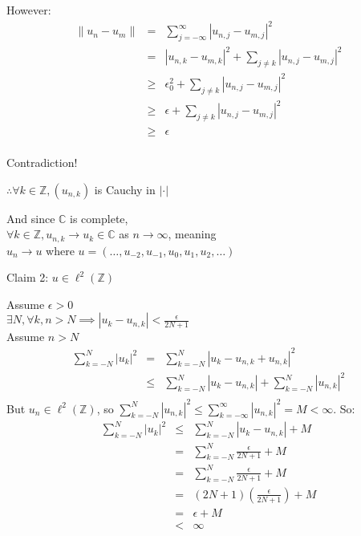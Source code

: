 \documentclass[letterpaper,12pt,fleqn]{article}
\newcommand{\abs}[1]{\left|#1\right|}
\newcommand{\norm}[1]{\lVert#1\rVert}
\newcommand{\C}{\mathbb{C}}
\newcommand{\Z}{\mathbb{Z}}
\newcommand{\ltwoz}{\ell^2(\Z)}
\begin{document}
\begin{description}
\begin{description}
\begin{theproof}
However:
\begin{eqnarray*}
\norm{u_n-u_m} &=& \sum_{j=-\infty}^{\infty}\abs{u_{n,j}-u_{m,j}}^2 \\
    &=& \abs{u_{n,k}-u_{m,k}}^2+\sum_{j\ne k}\abs{u_{n,j}-u_{m,j}}^2 \\
    &\ge& \epsilon_0^2+\sum_{j\ne k}\abs{u_{n,j}-u_{m,j}}^2 \\
    &\ge& \epsilon+\sum_{j\ne k}\abs{u_{n,j}-u_{m,j}}^2 \\
    &\ge& \epsilon \\
\end{eqnarray*}

Contradiction!

$\therefore\forall k\in\Z, (u_{n,k})$ is Cauchy in $\abs{\cdot}$
\end{theproof}
And since $\C$ is complete, \\
$\forall k\in\Z,u_{n,k}\to u_k\in\C$ as $n\to\infty$, meaning \\
$u_n\to u$ where $u=(\ldots, u_{-2}, u_{-1}, u_0, u_1, u_2, \ldots)$ \\

\item{Claim 2: $u\in\ltwoz$}
\begin{theproof}
Assume $\epsilon>0$ \\
$\exists N,\forall k,n>N\implies\abs{u_k-u_{n,k}}<\frac{\epsilon}{2N+1}$ \\
Assume $n>N$ \\
\begin{eqnarray*}
\sum_{k=-N}^{N}\abs{u_k}^2 &=& \sum_{k=-N}^{N}\abs{u_k-u_{n,k}+u_{n,k}}^2 \\
    &\le& \sum_{k=-N}^{N}\abs{u_k-u_{n,k}}+\sum_{k=-N}^{N}\abs{u_{n,k}}^2 \\
\end{eqnarray*}
But $u_n\in\ltwoz$, so $\sum_{k=-N}^{N}\abs{u_{n,k}}^2\le
    \sum_{k=-\infty}^{\infty}\abs{u_{n,k}}^2=M<\infty$. So:
\begin{eqnarray*}
\sum_{k=-N}^{N}\abs{u_k}^2 &\le& \sum_{k=-N}^{N}\abs{u_k-u_{n,k}}+M \\
    &=& \sum_{k=-N}^{N}\frac{\epsilon}{2N+1}+M \\
    &=& \sum_{k=-N}^{N}\frac{\epsilon}{2N+1}+M \\
    &=& (2N+1)\left(\frac{\epsilon}{2N+1}\right)+M \\
    &=& \epsilon+M \\
    &<& \infty \\
\end{eqnarray*}


\end{theproof}
\end{description}
\end{description}
\end{document}
